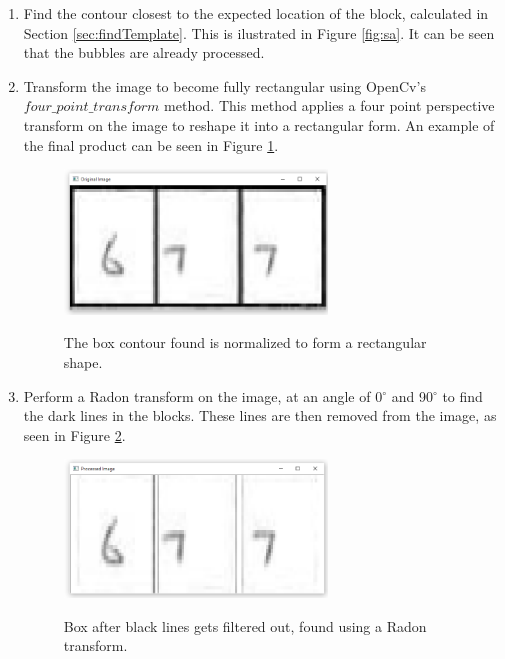 \begin{enumerate}
\item Find the contour closest to the expected location of the block, calculated in Section \ref{sec:findTemplate}. This is ilustrated in Figure \ref{fig:sa}. It can be seen that the bubbles are already processed.

\item Transform the image to become fully rectangular using OpenCv's $four\_point\_transform$ method. This method applies a four point perspective transform on the image to reshape it into a rectangular form. An example of the final product can be seen in Figure \ref{fig:bp}.

\begin{figure}
  \centering
  \includegraphics[width=7cm]{BeforeProcessing}\\
  \caption{The box contour found is normalized to form a rectangular shape.}
  \label{fig:bp}
\end{figure}

\item Perform a Radon transform on the image, at an angle of 0$^{\circ}$ and 90$^{\circ}$ to find the dark lines in the blocks. These lines are then removed from the image, as seen in Figure \ref{fig:ar}. 

\begin{figure}
  \centering
  \includegraphics[width=7cm]{AfterRadon}\\
  \caption{Box after black lines gets filtered out, found using a Radon transform.}
  \label{fig:ar}
\end{figure}


\end{enumerate}
